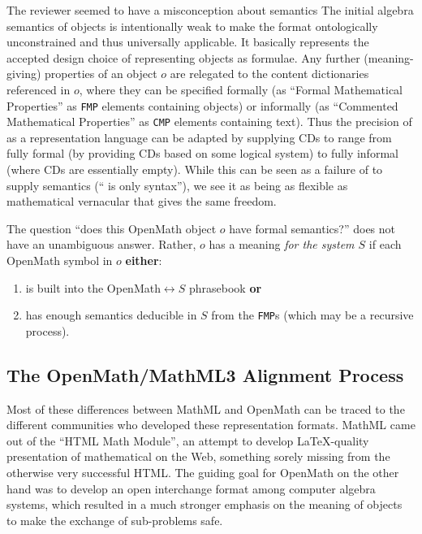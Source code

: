 \documentclass{llncs}
\begin{document}
\begin{newpart}{The reviewer seemed to have a misconception about semantics}
The initial algebra semantics of {\openmath} objects is intentionally weak to make the
{\openmath} format ontologically unconstrained and thus universally applicable. It
basically represents the accepted design choice of representing objects as formulae. Any
further (meaning-giving) properties of an object $o$ are relegated to the content
dictionaries referenced in $o$, where they can be specified formally (as ``Formal
Mathematical Properties'' as {\texttt{FMP}} elements containing {\openmath} objects) or
informally (as ``Commented Mathematical Properties'' as {\texttt{CMP}} elements containing
text). Thus the precision of {\openmath} as a representation language can be adapted by
supplying CDs to range from fully formal (by providing CDs based on some logical system)
to fully informal (where CDs are essentially empty). While this can be seen as a failure
of {\openmath} to supply semantics (``{\openmath} is only syntax''), we see it as being as
flexible as mathematical vernacular that gives the same freedom.

The question ``does this OpenMath object $o$ have formal semantics?'' does not have an unambiguous answer. Rather, $o$ has a meaning {\em for the system $S$\/} if each OpenMath symbol in $o$ {\bf either}:
\begin{enumerate}
\item is built into the OpenMath$\leftrightarrow S$ phrasebook {\bf or}
\item has enough semantics deducible in $S$ from the {\texttt{FMP}}s (which
may be a recursive process).
\end{enumerate}

\subsection{The OpenMath/MathML3 Alignment Process}\label{sec:alignment}

Most of these differences between MathML and OpenMath can be traced to the different
communities who developed these representation formats. MathML came out of the ``HTML Math
Module'', an attempt to develop {\LaTeX}-quality presentation of mathematical on the Web,
something sorely missing from the otherwise very successful HTML. The guiding goal for OpenMath on
the other hand was to develop an open interchange format among computer algebra systems,
which resulted in a much stronger emphasis on the meaning of objects to make the exchange
of sub-problems safe.


\end{newpart}
\end{document}
